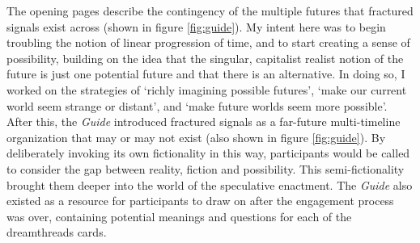 The opening pages describe the contingency of the multiple futures that fractured signals exist across (shown in figure \ref{fig:guide}).  My intent here was to begin troubling the notion of linear progression of time, and to start creating a sense of possibility, building on the idea that the singular, capitalist realist notion of the future is just one potential future and that there is an alternative. In doing so, I worked on the strategies of ‘richly imagining possible futures’, ‘make our current world seem strange or distant’, and ‘make future worlds seem more possible’.  After this, the \textit{Guide }introduced fractured signals as a far-future multi-timeline organization that may or may not exist (also shown in figure \ref{fig:guide}). By deliberately invoking its own fictionality in this way, participants would be called to consider the gap between reality, fiction and possibility. This semi-fictionality brought them deeper into the world of the speculative enactment. The \textit{Guide} also existed as a resource for participants to draw on after the engagement process was over, containing potential meanings and questions for each of the dreamthreads cards.

